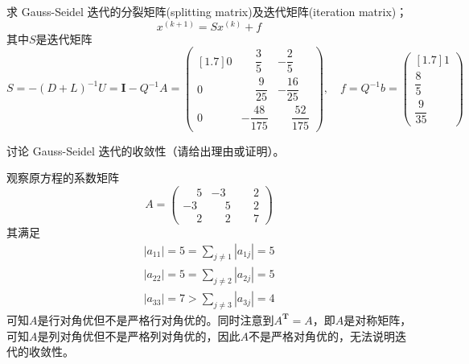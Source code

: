 \documentclass[11pt]{article}
\begin{document}
\begin{question}
\begin{subquestion}{求 Gauss-Seidel 迭代的分裂矩阵(splitting matrix)及迭代矩阵(iteration matrix)；}
{            \begin{equation*}
                x^{(k + 1)} = Sx^{(k)} + f
            \end{equation*}
            其中$S$是迭代矩阵
            \begin{equation*}
                S = -(D + L)^{-1}U = \mathbf{I} - Q^{-1}A =
                \begin{pmatrix}[1.7]
                    0 & \phantom{-}\dfrac{3}{5}  & -\dfrac{2}{5}              \\
                    0 & \phantom{-}\dfrac{9}{25} & -\dfrac{16}{25}            \\
                    0 & -\dfrac{48}{175}         & \phantom{-}\dfrac{52}{175}
                \end{pmatrix}
                ,\quad f = Q^{-1}b =
                \begin{pmatrix}[1.7]
                    1            \\
                    \dfrac{8}{5} \\
                    \dfrac{9}{35}
                \end{pmatrix}
            \end{equation*}
        }
    \end{subquestion}
    \begin{subquestion}{讨论 Gauss-Seidel 迭代的收敛性（请给出理由或证明）。}
        \answer
        {
            观察原方程的系数矩阵
            \begin{equation*}
                A =
                \begin{pmatrix}
                    \phantom{-}5 & -3           & \phantom{-}2 \\
                    -3           & \phantom{-}5 & \phantom{-}2 \\
                    \phantom{-}2 & \phantom{-}2 & \phantom{-}7
                \end{pmatrix}
            \end{equation*}
            其满足
            \begin{align*}
                \left|a_{11}\right| = 5 = \sum_{j \neq 1}{\left|a_{1j}\right|} = 5 \\
                \left|a_{22}\right| = 5 = \sum_{j \neq 2}{\left|a_{2j}\right|} = 5 \\
                \left|a_{33}\right| = 7 > \sum_{j \neq 3}{\left|a_{3j}\right|} = 4
            \end{align*}
            可知$A$是行对角优但不是严格行对角优的。同时注意到$A^\mathbf{T} = A$，即$A$是对称矩阵，可知$A$是列对角优但不是严格列对角优的，因此$A$不是严格对角优的，无法说明迭代的收敛性。

}
\end{subquestion}
\end{question}
\end{document}
